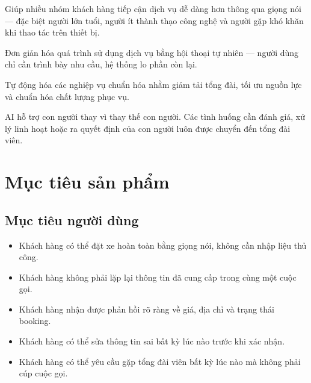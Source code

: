 \documentclass[12pt,a4paper]{article}
\begin{document}
\begin{description}[leftmargin=3em,style=nextline]
  \item[\textcolor{AloBlue}{\textbf{Accessibility}}] Giúp nhiều nhóm khách hàng tiếp cận dịch vụ dễ dàng hơn thông qua giọng nói --- đặc biệt người lớn tuổi, người ít thành thạo công nghệ và người gặp khó khăn khi thao tác trên thiết bị.
  \item[\textcolor{AloBlue}{\textbf{Convenience}}] Đơn giản hóa quá trình sử dụng dịch vụ bằng hội thoại tự nhiên --- người dùng chỉ cần trình bày nhu cầu, hệ thống lo phần còn lại.
  \item[\textcolor{AloBlue}{\textbf{Operational Efficiency}}] Tự động hóa các nghiệp vụ chuẩn hóa nhằm giảm tải tổng đài, tối ưu nguồn lực và chuẩn hóa chất lượng phục vụ.
  \item[\textcolor{AloBlue}{\textbf{Human-Centered AI}}] AI hỗ trợ con người thay vì thay thế con người. Các tình huống cần đánh giá, xử lý linh hoạt hoặc ra quyết định của con người luôn được chuyển đến tổng đài viên.
\end{description}

\section{Mục tiêu sản phẩm}

\subsection{Mục tiêu người dùng}
\begin{itemize}
  \item Khách hàng có thể đặt xe hoàn toàn bằng giọng nói, không cần nhập liệu thủ công.
  \item Khách hàng không phải lặp lại thông tin đã cung cấp trong cùng một cuộc gọi.
  \item Khách hàng nhận được phản hồi rõ ràng về giá, địa chỉ và trạng thái booking.
  \item Khách hàng có thể sửa thông tin sai bất kỳ lúc nào trước khi xác nhận.
  \item Khách hàng có thể yêu cầu gặp tổng đài viên bất kỳ lúc nào mà không phải cúp cuộc gọi.
\end{itemize}
\end{document}
